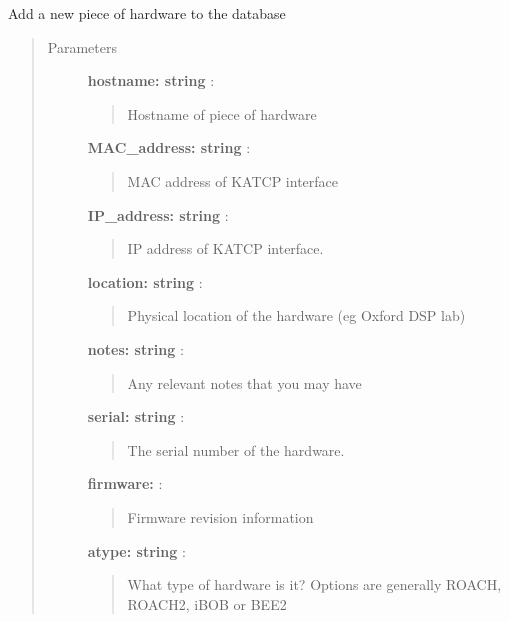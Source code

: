 \documentclass[letterpaper,10pt,english]{sphinxmanual}
\begin{document}
\begin{fulllineitems}
\label{index:roachnest_helpers.dbadd}
Add a new piece of hardware to the database
\begin{quote}\begin{description}
\item[{Parameters }] \leavevmode
\textbf{hostname: string} :
\begin{quote}

Hostname of piece of hardware
\end{quote}

\textbf{MAC\_address: string} :
\begin{quote}

MAC address of KATCP interface
\end{quote}

\textbf{IP\_address: string} :
\begin{quote}

IP address of KATCP interface.
\end{quote}

\textbf{location: string} :
\begin{quote}

Physical location of the hardware (eg Oxford DSP lab)
\end{quote}

\textbf{notes: string} :
\begin{quote}

Any relevant notes that you may have
\end{quote}

\textbf{serial: string} :
\begin{quote}

The serial number of the hardware.
\end{quote}

\textbf{firmware:} :
\begin{quote}

Firmware revision information
\end{quote}

\textbf{atype: string} :
\begin{quote}

What type of hardware is it? Options are generally ROACH, ROACH2, iBOB or BEE2
\end{quote}


\end{description}
\end{quote}
\end{fulllineitems}
\end{document}
